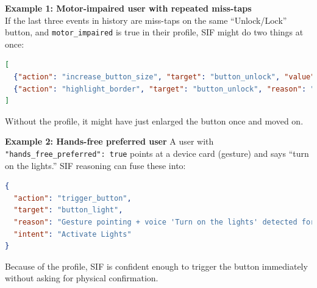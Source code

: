 \documentclass[openany]{book}
\begin{document}
\textbf{Example 1: Motor-impaired user with repeated miss-taps}\\
If the last three events in history are miss-taps on the same “Unlock/Lock” button, and \texttt{motor\_impaired} is true in their profile, SIF might do two things at once:
\newpage
\begin{lstlisting}[language=json, caption={Possible motor-impaired user adaptations}]
[
  {"action": "increase_button_size", "target": "button_unlock", "value": 1.5, "reason": "Multiple miss-taps detected, enlarging button for better accessibility"},
  {"action": "highlight_border", "target": "button_unlock", "reason": "Increase button visibility for the user"}
]
\end{lstlisting}
Without the profile, it might have just enlarged the button once and moved on.

\textbf{Example 2: Hands-free preferred user}
A user with \texttt{"hands\_free\_preferred": true} points at a device card (gesture) and says “turn on the lights.”
SIF reasoning can fuse these into:
\begin{lstlisting}[language=json, caption={Hands-free user intent fusion}]
{
  "action": "trigger_button",
  "target": "button_light",
  "reason": "Gesture pointing + voice 'Turn on the lights' detected for hands-free user",
  "intent": "Activate Lights"
}
\end{lstlisting}
Because of the profile, SIF is confident enough to trigger the button immediately without asking for physical confirmation.
\end{document}
